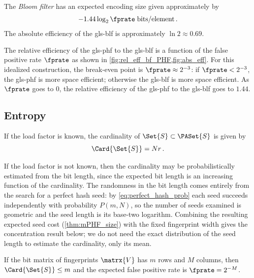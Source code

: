 \documentclass[ ../main.tex]{subfiles}
\begin{document}
The \emph{Bloom filter} has an expected encoding size given approximately by
\begin{equation}
    -1.44 \log_2 \fprate \; \si{bits \per element}\,.
\end{equation}
The absolute efficiency of the \gls{gls-blf} is approximately $\ln 2 \approx 0.69$.

The relative efficiency of the \gls{gls-phf} to the \gls{gls-blf} is a function of the false positive rate $\fprate$ as shown in \cref{fig:rel_eff_bf_PHF,fig:abs_eff}. For this idealized construction, the break-even point is $\fprate \approx 2^{-3}$: if $\fprate < 2^{-3}$, the \gls{gls-phf} is more space efficient; otherwise the \gls{gls-blf} is more space efficient. As $\fprate$ goes to $0$, the relative efficiency of the \gls{gls-phf} to the \gls{gls-blf} goes to $1.44$.

\subsection{Entropy}
If the load factor is known, the cardinality of $\Set{S} \subset \PASet{S}$ is given by
\begin{equation}
    \Card{\Set{S}} = N r\,.
\end{equation}

If the load factor is not known, then the cardinality may be probabilistically estimated from the bit length, since the expected bit length is an increasing function of the cardinality. The randomness in the bit length comes entirely from the search for a perfect hash seed: by \cref{eq:perfect_hash_prob} each seed succeeds independently with probability $P(m, N)$, so the number of seeds examined is geometric and the seed length is its base-two logarithm. Combining the resulting expected seed cost (\cref{thm:mPHF_size}) with the fixed fingerprint width gives the concentration result below; we do not need the exact distribution of the seed length to estimate the cardinality, only its mean.

If the bit matrix of fingerprints $\matrx{V}$ has $m$ rows and $M$ columns, then $\Card{\Set{S}} \leq m$ and the expected false positive rate is $\fprate=2^{-M}$.
\end{document}
